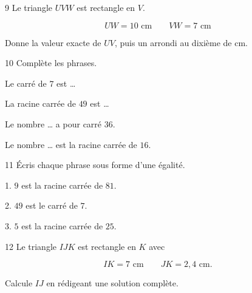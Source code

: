 \documentclass[9.5pt,a4paper,landscape]{article}
\begin{document}
\noindent
\begin{minipage}[t]{0.242\linewidth}
\begin{exo}{9}
Le triangle \(UVW\) est rectangle en \(V\).

\[
UW=10\text{ cm}
\qquad
VW=7\text{ cm}
\]

Donne la valeur exacte de \(UV\), puis un arrondi au dixième de cm.
\end{exo}
\end{minipage}
\hfill
%
\begin{minipage}[t]{0.242\linewidth}
\begin{exo}{10}
Complète les phrases.

\medskip

Le carré de \(7\) est \ldots

\medskip

La racine carrée de \(49\) est \ldots

\medskip

Le nombre \ldots{} a pour carré \(36\).

\medskip

Le nombre \ldots{} est la racine carrée de \(16\).
\end{exo}
\end{minipage}
\hfill
%
\begin{minipage}[t]{0.242\linewidth}
\begin{exo}{11}
Écris chaque phrase sous forme d'une égalité.

\medskip

1. \(9\) est la racine carrée de \(81\).

\medskip

2. \(49\) est le carré de \(7\).

\medskip

3. \(5\) est la racine carrée de \(25\).
\end{exo}
\end{minipage}
\hfill
%
\begin{minipage}[t]{0.242\linewidth}
\begin{exo}{12}
Le triangle \(IJK\) est rectangle en \(K\) avec

\[
IK=7\text{ cm}
\qquad
JK=2{,}4\text{ cm}.
\]

Calcule \(IJ\) en rédigeant une solution complète.
\end{exo}
\end{minipage}
\end{document}
